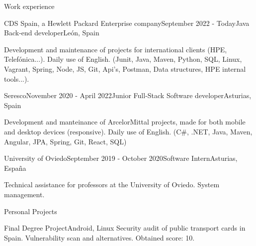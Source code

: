 \documentclass{resume} %
\begin{document}

\begin{rSection}{Work experience}

\begin{rSubsection}{CDS Spain, a Hewlett Packard Enterprise company}{September 2022 - Today}{Java Back-end developer}{León, Spain}
\item Development and maintenance of projects for international clients (HPE, Telefónica...). Daily use of English. (Junit, Java, Maven, Python, SQL, Linux, Vagrant, Spring, Node, JS, Git, Api's, Postman, Data structures, HPE internal tools...).
\end{rSubsection}

\begin{rSubsection}{Seresco}{November 2020 - April 2022}{Junior Full-Stack Software developer}{Asturias, Spain}
\item Development and manteinance of ArcelorMittal projects, made for both mobile and desktop devices (responsive). Daily use of English. (C\#, .NET, Java, Maven, Angular, JPA, Spring, Git, React, SQL)
\end{rSubsection}

\begin{rSubsection}{University of Oviedo}{September 2019 - October 2020}{Software Intern}{Asturias, España}
\item Technical assistance for professors at the University of Oviedo. System management.
\end{rSubsection}

\end{rSection}


\begin{rSection}{Personal Projects}
\begin{rSubsection}{{Final Degree Project}}{Android, Linux}{}{}
Security audit of public transport cards in Spain. Vulnerability scan and alternatives.
Obtained score: 10.
\end{rSubsection}
\end{rSection}
\end{document}
